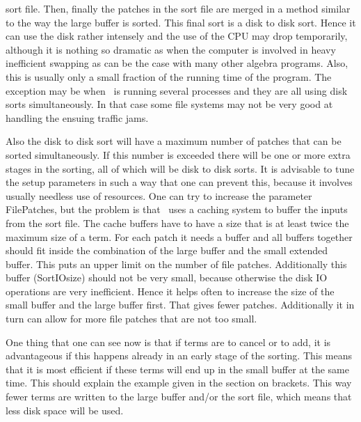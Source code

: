 sort file. Then, finally the patches in the sort file are merged in a 
method similar to the way the large buffer is sorted. This final sort is a 
disk to disk sort. Hence it can use the disk 
rather intensely and the use of the CPU may drop temporarily, although it 
is nothing so dramatic as when the computer is involved in heavy 
inefficient swapping as can be the case with many other algebra programs. 
Also, this is usually only a small fraction of the running time of the 
program. The exception may be when \FORM\ is running several processes and 
they are all using disk sorts simultaneously. In that case some file 
systems may not be very good at handling the ensuing
traffic jams.

Also the disk to disk sort will have a maximum number of patches that can 
be sorted simultaneously. If this number is exceeded there will be one or 
more extra stages in the sorting, all of which 
will be disk to disk sorts. It is advisable to tune the setup parameters in 
such a way that one can prevent this, because it involves usually needless 
use of resources. One can try to increase the parameter 
FilePatches, but the problem is that \FORM\ uses a 
caching system to buffer the inputs from the sort file. The 
cache buffers have to have a size that is at least twice the maximum size 
of a term. For each patch it needs a buffer and all buffers together should 
fit inside the combination of the large buffer and the small extended 
buffer. This puts an upper limit on the number of file patches. 
Additionally this buffer (SortIOsize) should not be very 
small, because otherwise the disk IO operations are very inefficient. Hence 
it helps often to increase the size of the small buffer and the large 
buffer first. That gives fewer patches. Additionally it in turn can allow 
for more file patches that are not too small.

One thing that one can see now is that if terms are to cancel or to add, it 
is advantageous if this happens already in an early stage of the sorting. 
This means that it is most efficient if these terms will end up in the 
small buffer at the same time. This should explain the example given in the 
section on brackets. This way fewer terms are written to 
the large buffer and/or the sort file, which means that less disk space 
will be used.

